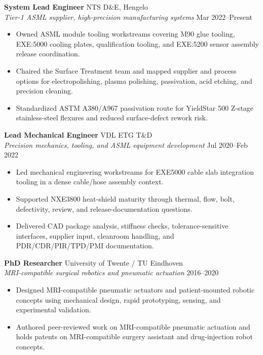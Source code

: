 \documentclass[10pt,a4paper]{article}
\begin{document}
\textbf{System Lead Engineer} \hfill NTS D\&E, Hengelo \\
{\small\textit{Tier-1 ASML supplier, high-precision manufacturing systems}} \hfill {\small Mar 2022--Present}
\begin{itemize}
 \item Owned ASML module tooling workstreams covering M90 glue tooling, EXE:5000 cooling plates, qualification tooling, and EXE:5200 sensor assembly release coordination.
 \item Chaired the Surface Treatment team and mapped supplier and process options for electropolishing, plasma polishing, passivation, acid etching, and precision cleaning.
 \item Standardized ASTM A380/A967 passivation route for YieldStar 500 Z-stage stainless-steel flexures and reduced surface-defect rework risk.
\end{itemize}

\vspace{4pt}
\textbf{Lead Mechanical Engineer} \hfill VDL ETG T\&D \\
{\small\textit{Precision mechanics, tooling, and ASML equipment development}} \hfill {\small Jul 2020--Feb 2022}
\begin{itemize}
 \item Led mechanical engineering workstreams for EXE5000 cable slab integration tooling in a dense cable/hose assembly context.
 \item Supported NXE3800 heat-shield maturity through thermal, flow, bolt, defectivity, review, and release-documentation questions.
 \item Delivered CAD package analysis, stiffness checks, tolerance-sensitive interfaces, supplier input, cleanroom handling, and PDR/CDR/PIR/TPD/PMI documentation.
\end{itemize}

\vspace{4pt}
\textbf{PhD Researcher} \hfill University of Twente / TU Eindhoven \\
{\small\textit{MRI-compatible surgical robotics and pneumatic actuation}} \hfill {\small 2016--2020}
\begin{itemize}
 \item Designed MRI-compatible pneumatic actuators and patient-mounted robotic concepts using mechanical design, rapid prototyping, sensing, and experimental validation.
 \item Authored peer-reviewed work on MRI-compatible pneumatic actuation and holds patents on MRI-compatible surgery assistant and drug-injection robot concepts.
\end{itemize}
\end{document}
